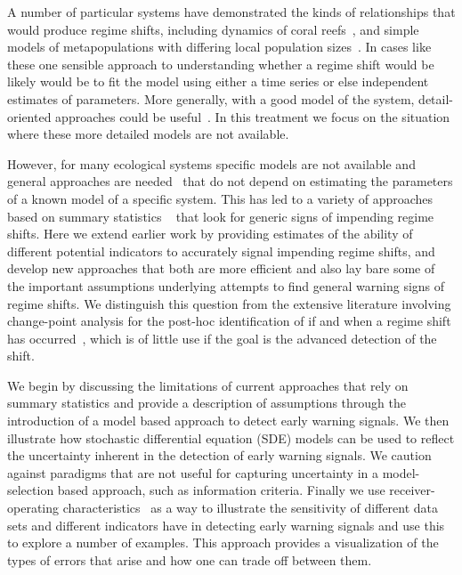 \documentclass[authoryear,review,11pt]{elsarticle}
\begin{document}
A number of particular systems have demonstrated the kinds of relationships that would produce regime shifts,
including dynamics of coral reefs~\citep{Mumby2007},
and simple models of metapopulations with differing local population sizes~\citep{Hastings1991a}.
In cases like these one sensible approach to understanding 
whether a regime shift would be likely would be 
to fit the model using either a time series or else independent estimates of parameters. 
More generally, with a good model of the system, detail-oriented approaches could be useful~\citep{Lade2012}.  
In this treatment we focus on the situation where these more detailed models are not available.  

However, for many ecological systems specific models are not available and general approaches are needed~\citep{Scheffer2009, Lade2012}
that do not depend on estimating the parameters of a known model of a specific system. 
This has led to a variety of approaches based on summary statistics
~\citep[\emph{e.g.}][]{Carpenter2006, Held2004, Dakos2008, Guttal2008, Biggs2009, Carpenter2011, Seekell2011}
that look for generic signs of impending regime shifts.  
Here we extend earlier work by providing estimates 
of the ability of different potential indicators to accurately signal impending regime shifts,
and develop new approaches that both are more efficient
and also lay bare some of the important assumptions underlying attempts 
to find general warning signs of regime shifts.  
We distinguish this question from the extensive literature involving change-point analysis 
for the post-hoc identification of if and when a regime shift has occurred~\citep{Easterling1995, Rodionov2004, Lenton2009}, 
which is of little use if the goal is the advanced detection of the shift.  


We begin by discussing the limitations of current approaches that rely on summary statistics
and provide a description of assumptions through the introduction of a model based approach to detect early warning signals.
We then illustrate how stochastic differential equation (SDE) models can be used
to reflect the uncertainty inherent in the detection of early warning signals. 
We caution against paradigms that are not useful for capturing uncertainty in
a model-selection based approach, such as information criteria.
Finally we use receiver-operating characteristics~\citep{Green1989, Keller2009}
as a way to illustrate the sensitivity of different data sets
and different indicators have in detecting early warning signals and use this to explore a number of examples.
This approach provides a visualization of the types of errors that arise and how one can trade off between them.  
\end{document}
